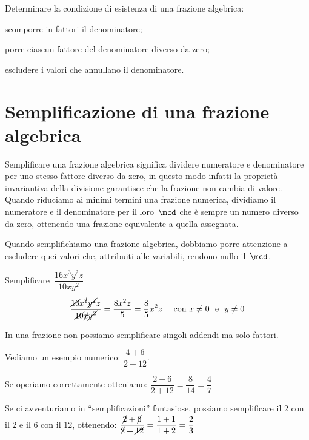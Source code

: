 \begin{procedura}
Determinare la condizione di esistenza di una frazione algebrica:
\begin{enumeratea}
\item scomporre in fattori il denominatore;
\item porre ciascun fattore del denominatore diverso da zero;
\item escludere i valori che annullano il denominatore.
\end{enumeratea}
\end{procedura}


\section{Semplificazione di una frazione algebrica}
\label{sec:frazalg_semplificazione}

Semplificare una frazione algebrica significa dividere numeratore e 
denominatore per uno stesso fattore diverso da zero, in questo modo infatti 
la proprietà invariantiva della divisione garantisce che la frazione non 
cambia di valore.
Quando riduciamo ai minimi termini una frazione numerica, dividiamo il 
numeratore e il denominatore per il loro~\(\mcd\) che è sempre un numero
diverso da zero, ottenendo una frazione equivalente a quella assegnata.

Quando semplifichiamo una frazione algebrica, dobbiamo 
porre attenzione a escludere quei valori che, attribuiti alle variabili, 
rendono nullo il~\(\mcd\).

 \begin{esempio}
Semplificare~\(\dfrac{16x^{3}y^{2}z}{10xy^{2}}\)
\[\dfrac{\cancel{16}x^{\cancel{3}}\cancel{y^{2}}z}
        {\cancel{10}\cancel{x}\cancel{y^{2}}}=
\dfrac{8x^{2}z}{5}=\dfrac{8}{5}x^{2}z
\quad \text{ con } x \ne 0 \text{~~e~~} y \ne 0
\]
 \end{esempio}

 \osservazione In una frazione non possiamo semplificare singoli addendi 
 ma solo fattori. 
 
 Vediamo un esempio numerico: \quad \(\dfrac{4+6}{2+12}\). 
 
Se operiamo correttamente otteniamo: \quad
\(\dfrac{2+6}{2+12}=\dfrac{8}{14}=\dfrac{4}{7}\)

Se ci avventuriamo in ``semplificazioni'' fantasiose, possiamo 
semplificare il \(2\) con il \(2\) e il \(6\) con il 
\(12\), ottenendo: \quad
\(\dfrac{\cancel{2} +\cancel{6}}{\cancel{2} +\cancel{12}}=
\dfrac{1+1}{1+2}=\dfrac{2}{3}\)

